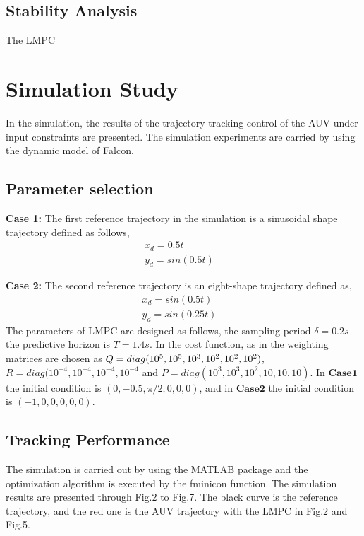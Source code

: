 \documentclass[journal,11pt,draftcls,onecolumn]{IEEEtran}
\begin{document}
\subsection{Stability Analysis}
The LMPC 
\section{Simulation Study}
In the simulation, the results of the trajectory tracking control of the AUV under input constraints are presented. The simulation experiments are carried by using the dynamic model of Falcon\cite{proctor2014semi}. 
\subsection{Parameter selection}
\textbf{Case 1:}
The first reference trajectory in the simulation is a sinusoidal shape trajectory defined as follows,
\begin{equation} 
\begin{split}
   x_d=0.5t&\\
   y_d=sin(0.5t)&
\end{split}
\end{equation}

\textbf{Case 2:}
The second reference trajectory is an eight-shape trajectory defined as,
\begin{equation}
\begin{split}
   x_d=sin(0.5t)&\\
   y_d=sin(0.25t)&
\end{split}
\end{equation}
The parameters of LMPC are designed as follows, the sampling period $\delta=0.2s$ the predictive horizon is $T=1.4s$. In the cost function, as in \cite{shen1lyapunov} the weighting matrices are chosen as $Q=diag(10^5,10^5,10^3,10^2,\\10^2,10^2)$, $R=diag(10^{-4},10^{-4},10^{-4},10^{-4}$ and $P=diag(10^3,10^3,10^2,10,10,10)$. In $\textbf{Case1}$ the initial condition is $(0,-0.5,\pi/2,0,0,0)$, and in $\textbf{Case2}$ the initial condition is $(-1,0,0,0,0,0)$. 
\subsection{Tracking Performance}
The simulation is carried out by using the MATLAB package and the optimization algorithm is executed by the fminicon function. The simulation results are presented through Fig.2 to Fig.7. The black curve is the reference trajectory, and the red one is the AUV trajectory with the LMPC in Fig.2 and Fig.5.
\end{document}
